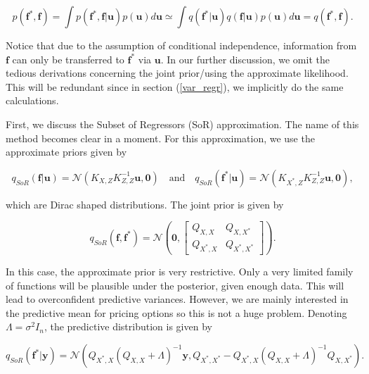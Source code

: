 \documentclass[12pt,a4paper,oneside]{book}
\begin{document}
\begin{equation}
p(\bm{f}^{\ast},\bm{f}) = \int p( \bm{f}^{\ast},\bm{f} | \bm{u}) p (\bm{u}) d\bm{u}  \simeq  \int q(\bm{f}^{\ast}|\bm{u}) q(\bm{f}|\bm{u}) p(\bm{u}) d\bm{u} = q(\bm{f}^{\ast}, \bm{f}) .
\end{equation}

Notice that due to the assumption of conditional independence, information from $\bm{f}$ can only be transferred to $\bm{f}^{\ast}$ via $\bm{u}$. In our further discussion, we omit the tedious derivations concerning the joint prior/using the approximate likelihood. This will be redundant since in section (\ref{var_regr}), we implicitly do the same calculations.

First, we discuss the Subset of Regressors (SoR) approximation. The name of this method becomes clear in a moment. For this approximation, we use the approximate priors given by 

\begin{equation}
q_{SoR}(\bm{f}|\bm{u}) = \mathcal{N}(K_{X,Z} K^{-1}_{Z,Z} \bm{u} , \bm{0}) \quad \text{and} \quad q_{SoR}(\bm{f}^{\ast} | \bm{u}) =\mathcal{N}(K_{X^{\ast},Z} K^{-1}_{Z,Z} \bm{u} , \bm{0}),
\end{equation}

which are Dirac shaped distributions. The joint prior is given by

\begin{equation}\label{prior_DTC}
q_{SoR}(\bm{f},\bm{f}^{\ast}) = 
\mathcal{N} \left( \bm{0}, 
\begin{bmatrix}
    Q_{X,X} & Q_{X,X^{\ast}}\\
    Q_{X^{\ast},X}  & Q_{X^{\ast},X^{\ast}}
\end{bmatrix} 
\right).
\end{equation}

In this case, the approximate prior is very restrictive. Only a very limited family of functions will be plausible under the posterior, given enough data. This will lead to overconfident predictive variances. However, we are mainly interested in the predictive mean for pricing options so this is not a huge problem. Denoting $\Lambda = \sigma^2 I_n$, the predictive distribution is given by 

\begin{equation}\label{sparse_sor}
q_{SoR} (\bm{f}^{\ast} | \bm{y} ) = \mathcal{N}(Q_{X^{\ast},X}(Q_{X,X} + \Lambda)^{-1}\bm{y}, Q_{X^{\ast} ,X^{\ast}} - Q_{X^{\ast},X}(Q_{X,X} + \Lambda)^{-1} Q_{X,X^{\ast}}).
\end{equation}
\end{document}
